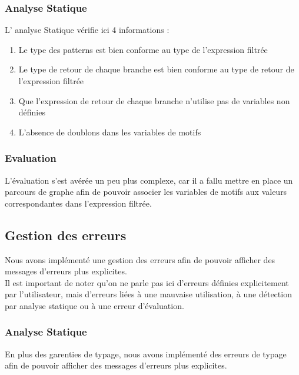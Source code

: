 \documentclass[
  12pt,
]{article}
\begin{document}
\subsubsection{Analyse Statique}\label{analyse-statique}

L' analyse Statique vérifie ici 4 informations :

\begin{enumerate}
      \item
            Le type des patterns est bien conforme au type de l'expression filtrée
      \item
            Le type de retour de chaque branche est bien conforme au type de retour de l'expression filtrée
      \item
            Que l'expression de retour de chaque branche n'utilise pas de variables non définies
      \item
            L'absence de doublons dans les variables de motifs
\end{enumerate}

\subsubsection{Evaluation}\label{evaluation}

L'évaluation s'est avérée un peu plus complexe, car il a fallu mettre en
place un parcours de graphe afin de pouvoir associer les variables de
motifs aux valeurs correspondantes dans l'expression filtrée.

\pagebreak

\subsection{Gestion des erreurs}\label{gestion-des-erreurs}

Nous avons implémenté une gestion des erreurs afin de pouvoir afficher
des messages d'erreurs plus explicites.\\
Il est important de noter qu'on ne parle pas ici d'erreurs définies
explicitement par l'utilisateur, mais d'erreurs liées à une mauvaise
utilisation, à une détection par analyse statique ou à une erreur
d'évaluation.

\subsubsection{Analyse Statique}\label{analyse-statique-1}

En plus des garenties de typage, nous avons implémenté des erreurs de
typage afin de pouvoir afficher des messages d'erreurs plus explicites.
\end{document}
